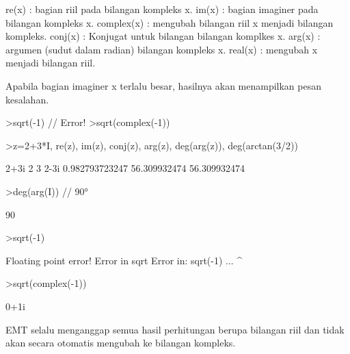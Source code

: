 \documentclass[a4paper,10pt]{article}
\begin{document}
\begin{eulernotebook}
\begin{eulercomment}
\begin{eulercomment}
\begin{eulercomment}
\end{eulercomment}
\begin{eulerttcomment}
  re(x) : bagian riil pada bilangan kompleks x.
  im(x) : bagian imaginer pada bilangan kompleks x.
  complex(x) : mengubah bilangan riil x menjadi bilangan kompleks.
  conj(x) : Konjugat untuk bilangan bilangan komplkes x.
  arg(x) : argumen (sudut dalam radian) bilangan kompleks x.
  real(x) : mengubah x menjadi bilangan riil.
\end{eulerttcomment}
\begin{eulercomment}

Apabila bagian imaginer x terlalu besar, hasilnya akan menampilkan
pesan kesalahan.

\end{eulercomment}
\begin{eulerttcomment}
  >sqrt(-1) // Error!
  >sqrt(complex(-1))
\end{eulerttcomment}
\begin{eulerprompt}
>z=2+3*I, re(z), im(z), conj(z), arg(z), deg(arg(z)), deg(arctan(3/2))
\end{eulerprompt}
\begin{euleroutput}
  2+3i
  2
  3
  2-3i
  0.982793723247
  56.309932474
  56.309932474
\end{euleroutput}
\begin{eulerprompt}
>deg(arg(I)) // 90°
\end{eulerprompt}
\begin{euleroutput}
  90
\end{euleroutput}
\begin{eulerprompt}
>sqrt(-1)
\end{eulerprompt}
\begin{euleroutput}
  Floating point error!
  Error in sqrt
  Error in:
  sqrt(-1) ...
          ^
\end{euleroutput}
\begin{eulerprompt}
>sqrt(complex(-1))
\end{eulerprompt}
\begin{euleroutput}
  0+1i
\end{euleroutput}
\begin{eulercomment}
EMT selalu menganggap semua hasil perhitungan berupa bilangan riil dan tidak
akan secara otomatis mengubah ke bilangan kompleks.


\end{eulercomment}
\end{eulercomment}
\end{eulercomment}
\end{eulernotebook}
\end{document}
